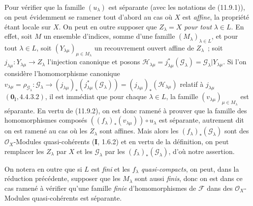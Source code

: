 \begin{env}[11.9.3]
\label{IV.11.9.3-fr}
Pour vérifier que la famille $(u_\lambda)$ est séparante (avec les notations de
(11.9.1)), on peut évidemment se ramener tout d'abord au cas où $X$ est
\emph{affine}, la propriété étant locale sur $X$. On peut en outre supposer que
$Z_\lambda=X$ \emph{pour tout} $\lambda\in L$. En effet, soit $M$ un ensemble
d'indices, somme d'une famille $(M_\lambda)_{\lambda\in L}$, et pour tout
$\lambda\in L$, soit $(Y_{\lambda\mu})_{\mu\in M_\lambda}$ un recouvrement
ouvert affine de $Z_\lambda$~; soit
$j_{\lambda\mu}:Y_{\lambda\mu}\to Z_\lambda$ l'injection canonique et posons
$\mathcal H_{\lambda\mu}=j_{\lambda\mu}^*(\mathcal G_\lambda)
=\mathcal G_\lambda|Y_{\lambda\mu}$. Si l'on considère l'homomorphisme
canonique
$v_{\lambda\mu}=\rho_{\mathcal G_\lambda}:\mathcal G_\lambda\to
(j_{\lambda\mu})_*(j_{\lambda\mu}^*(\mathcal G_\lambda))
=(j_{\lambda\mu})_*(\mathcal H_{\lambda\mu})$ relatif à $j_{\lambda\mu}$
$(\mathbf 0_{\mathrm I},4.4.3.2)$, il est immédiat que pour chaque
$\lambda\in L$, la famille $(v_{\lambda\mu})_{\mu\in M_\lambda}$ est
séparante. En vertu de (11.9.2), on est donc ramené à prouver que la famille des
homomorphismes composés $((f_\lambda)_*(v_{\lambda\mu}))\circ u_\lambda$ est
séparante, autrement dit on est ramené au cas où les $Z_\lambda$ sont affines.
Mais alors les $(f_\lambda)_*(\mathcal G_\lambda)$ sont des
$\mathcal O_X$-Modules quasi-cohérents (\textbf I, 1.6.2) et en vertu de la
définition, on peut remplacer les $Z_\lambda$ par $X$ et les
$\mathcal G_\lambda$ par les $(f_\lambda)_*(\mathcal G_\lambda)$, d'où notre
assertion.

On notera en outre que si $L$ est \emph{fini} et les $f_\lambda$
\emph{quasi-compacts}, on peut, dans la réduction précédente, supposer que les
$M_\lambda$ sont aussi \emph{finis}, donc on est dans ce cas ramené à vérifier
qu'une famille \emph{finie} d'homomorphismes de $\mathcal F$ dans des
$\mathcal O_X$-Modules quasi-cohérents est séparante.
\end{env}

